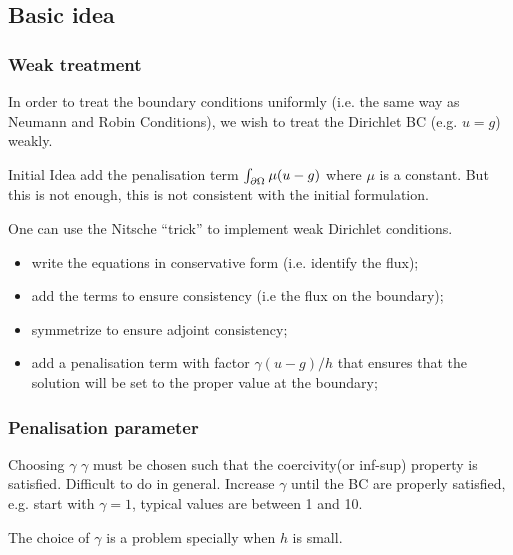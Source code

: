 \subsection{Basic idea}

\subsubsection{Weak treatment}
  In order to treat the boundary conditions uniformly (i.e. the same
  way as Neumann and Robin Conditions), we wish to treat the Dirichlet
  BC (e.g. $u=g$) weakly.

  \begin{remark}{Initial Idea}
    add the penalisation term $\int_{\partial {\ensuremath{\Omega^{}}}} \mu( u - g
    )$ where $\mu$ is a constant. But this is not enough, this is not consistent with the
    initial formulation.
  \end{remark}

  One can use the Nitsche ``trick'' to implement weak Dirichlet conditions.
  \begin{itemize}
  \item write the equations in conservative form (i.e. identify the flux);
  \item add the terms to ensure consistency (i.e the flux on the boundary);
  \item symmetrize to ensure adjoint consistency;
  \item add a penalisation term with factor $\gamma (u-g)/h$ that ensures
    that the solution will be set to the proper value at the boundary;
  \end{itemize}


\subsubsection{Penalisation parameter}
    \begin{remark}{Choosing $\gamma$}
    $\gamma$ must be chosen such that the coercivity(or inf-sup)
    property is satisfied. Difficult to do in general. Increase
    $\gamma$ until the BC are properly satisfied, e.g. start with
    $\gamma=1$, typical values are between 1 and 10.

    The choice of $\gamma$ is a problem specially when $h$ is small.
  \end{remark}



